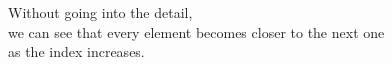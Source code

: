\documentclass[preview]{standalone}
\begin{document}
\begin{center}
Without going into the detail, \\we can see that every element becomes closer to the next one \\as the index increases.
\end{center}
\end{document}
